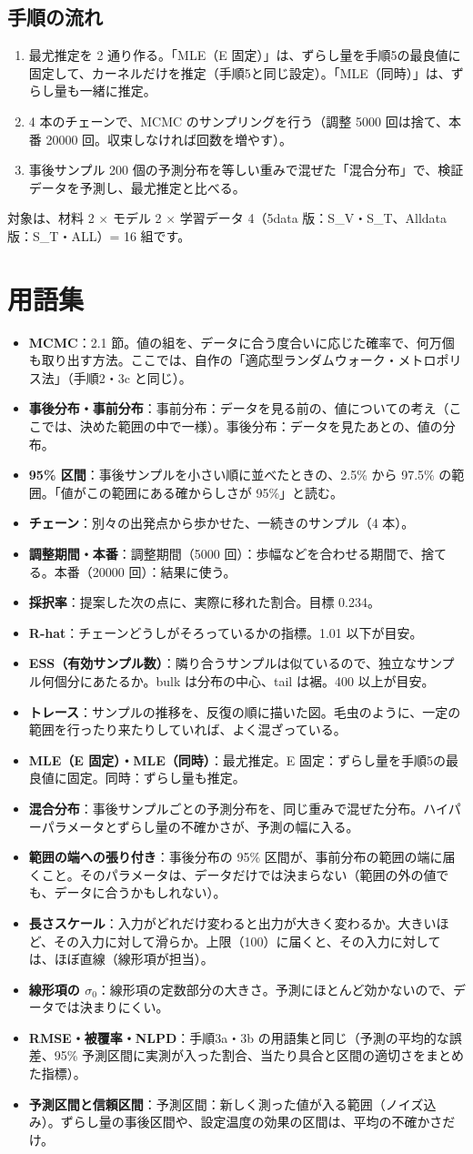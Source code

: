 \documentclass[paper=a4paper,fontsize=10.5pt,line_length=44zw,number_of_lines=38]{jlreq}
\newenvironment{termlist}{\begin{itemize}[label=・,leftmargin=1\zw,labelwidth=1\zw,labelsep=0pt,itemsep=0.4ex,topsep=0.6ex,parsep=0pt]}{\end{itemize}}
\newcommand{\term}[1]{\item \textbf{#1}：}
\begin{document}
\subsection{手順の流れ}
\begin{enumerate}[itemsep=0.3ex,topsep=0.5ex]
\item 最尤推定を 2 通り作る。「MLE（E 固定）」は、ずらし量を手順5の最良値に固定して、カーネルだけを推定（手順5と同じ設定）。「MLE（同時）」は、ずらし量も一緒に推定。
\item 4 本のチェーンで、MCMC のサンプリングを行う（調整 5000 回は捨て、本番 20000 回。収束しなければ回数を増やす）。
\item 事後サンプル 200 個の予測分布を等しい重みで混ぜた「混合分布」で、検証データを予測し、最尤推定と比べる。
\end{enumerate}
対象は、材料 2 $\times$ モデル 2 $\times$ 学習データ 4（5data 版：S\_V・S\_T、Alldata 版：S\_T・ALL）= 16 組です。

\section{用語集}
\begin{termlist}
\term{MCMC}2.1 節。値の組を、データに合う度合いに応じた確率で、何万個も取り出す方法。ここでは、自作の「適応型ランダムウォーク・メトロポリス法」（手順2・3c と同じ）。
\term{事後分布・事前分布}事前分布：データを見る前の、値についての考え（ここでは、決めた範囲の中で一様）。事後分布：データを見たあとの、値の分布。
\term{95\% 区間}事後サンプルを小さい順に並べたときの、2.5\% から 97.5\% の範囲。「値がこの範囲にある確からしさが 95\%」と読む。
\term{チェーン}別々の出発点から歩かせた、一続きのサンプル（4 本）。
\term{調整期間・本番}調整期間（5000 回）：歩幅などを合わせる期間で、捨てる。本番（20000 回）：結果に使う。
\term{採択率}提案した次の点に、実際に移れた割合。目標 0.234。
\term{R-hat}チェーンどうしがそろっているかの指標。1.01 以下が目安。
\term{ESS（有効サンプル数）}隣り合うサンプルは似ているので、独立なサンプル何個分にあたるか。bulk は分布の中心、tail は裾。400 以上が目安。
\term{トレース}サンプルの推移を、反復の順に描いた図。毛虫のように、一定の範囲を行ったり来たりしていれば、よく混ざっている。
\term{MLE（E 固定）・MLE（同時）}最尤推定。E 固定：ずらし量を手順5の最良値に固定。同時：ずらし量も推定。
\term{混合分布}事後サンプルごとの予測分布を、同じ重みで混ぜた分布。ハイパーパラメータとずらし量の不確かさが、予測の幅に入る。
\term{範囲の端への張り付き}事後分布の 95\% 区間が、事前分布の範囲の端に届くこと。そのパラメータは、データだけでは決まらない（範囲の外の値でも、データに合うかもしれない）。
\term{長さスケール}入力がどれだけ変わると出力が大きく変わるか。大きいほど、その入力に対して滑らか。上限（100）に届くと、その入力に対しては、ほぼ直線（線形項が担当）。
\term{線形項の $\sigma_0$}線形項の定数部分の大きさ。予測にほとんど効かないので、データでは決まりにくい。
\term{RMSE・被覆率・NLPD}手順3a・3b の用語集と同じ（予測の平均的な誤差、95\% 予測区間に実測が入った割合、当たり具合と区間の適切さをまとめた指標）。
\term{予測区間と信頼区間}予測区間：新しく測った値が入る範囲（ノイズ込み）。ずらし量の事後区間や、設定温度の効果の区間は、平均の不確かさだけ。
\end{termlist}
\end{document}
